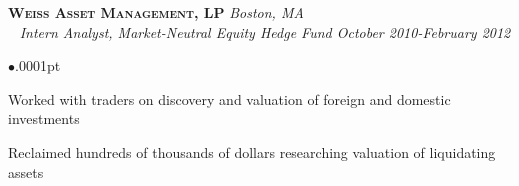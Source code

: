 \documentclass[11pt]{article}
\newcommand{\employer}[4]{
	{\hspace*{-20pt} {\small{\textbf{\textsc{ #1}}}}
  \hfill \small{\emph{#2}}\\ ~\hspace*{-20pt} \small \emph{ #3 \hfill #4}}\\ }
\newenvironment{achievements}{\begin{list}{$\bullet$}{\topsep .0001pt \itemsep -2pt}}{\vspace*{5pt}\end{list} }
\begin{document}

\employer{Weiss Asset Management, LP} {Boston, MA} {Intern Analyst, Market-Neutral Equity Hedge Fund} {October 2010-February 2012}
	\begin{achievements}
		\item Worked with traders on discovery and valuation of foreign and domestic investments %
		\item Reclaimed hundreds of thousands of dollars researching valuation of liquidating assets
	\end{achievements}
	


\end{document}

